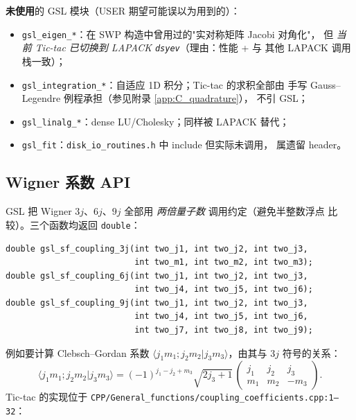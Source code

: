 \textbf{未使用}的 GSL 模块（USER 期望可能误以为用到的）：
\begin{itemize}
\item \texttt{gsl\_eigen\_*}：在 SWP 构造中曾用过的"实对称矩阵 Jacobi 对角化"，
      但 \emph{当前 Tic-tac 已切换到 LAPACK \texttt{dsyev}}（理由：性能 + 与
      其他 LAPACK 调用栈一致）；
\item \texttt{gsl\_integration\_*}：自适应 1D 积分；Tic-tac 的求积全部由
      手写 Gauss--Legendre 例程承担（参见附录 \ref{app:C_quadrature}），
      不引 GSL；
\item \texttt{gsl\_linalg\_*}：dense LU/Cholesky；同样被 LAPACK 替代；
\item \texttt{gsl\_fit}：\texttt{disk\_io\_routines.h} 中 include 但实际未调用，
      属遗留 header。
\end{itemize}

\subsection{Wigner 系数 API}

GSL 把 Wigner $3j$、$6j$、$9j$ 全部用 \emph{两倍量子数} 调用约定（避免半整数浮点
比较）。三个函数均返回 \texttt{double}：

\begin{lstlisting}[style=cpp,caption={GSL Wigner 系数核心 API。}]
double gsl_sf_coupling_3j(int two_j1, int two_j2, int two_j3,
                          int two_m1, int two_m2, int two_m3);
double gsl_sf_coupling_6j(int two_j1, int two_j2, int two_j3,
                          int two_j4, int two_j5, int two_j6);
double gsl_sf_coupling_9j(int two_j1, int two_j2, int two_j3,
                          int two_j4, int two_j5, int two_j6,
                          int two_j7, int two_j8, int two_j9);
\end{lstlisting}

例如要计算 Clebsch--Gordan 系数
$\langle j_1 m_1; j_2 m_2 | j_3 m_3\rangle$，由其与 $3j$ 符号的关系：
\begin{equation}
  \langle j_1 m_1; j_2 m_2 | j_3 m_3\rangle
  = (-1)^{j_1-j_2+m_3}\sqrt{2j_3+1}\,
    \begin{pmatrix} j_1 & j_2 & j_3 \\ m_1 & m_2 & -m_3 \end{pmatrix}.
\end{equation}
Tic-tac 的实现位于
\texttt{CPP/General\_functions/coupling\_coefficients.cpp:1--32}：

